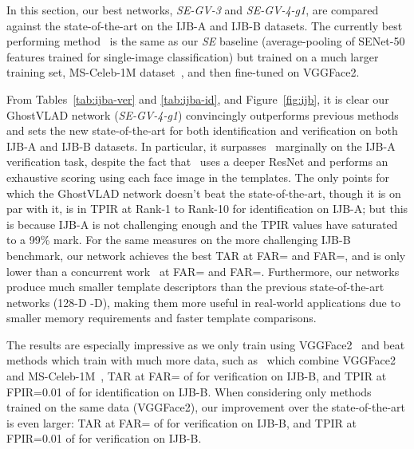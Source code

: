 \documentclass[runningheads]{llncs}
\begin{document}
 

In this section, our best networks,
\emph{SE-GV-3} and \emph{SE-GV-4-g1},
are compared against the state-of-the-art
on the IJB-A and IJB-B datasets.
The currently best performing method~\cite{Cao18}
is the same as our \emph{SE} baseline
(\ie average-pooling of SENet-50 features
trained for single-image classification)
but trained on a much larger training set,
MS-Celeb-1M dataset~\cite{Guo16},
and then fine-tuned on VGGFace2.

From Tables~\ref{tab:ijba-ver} and \ref{tab:ijba-id},
and Figure~\ref{fig:ijb},
it is clear our GhostVLAD network (\emph{SE-GV-4-g1})
convincingly outperforms previous methods and sets
the new state-of-the-art for both identification and
verification on both IJB-A and IJB-B datasets.
In particular, it surpasses~\cite{Zheng18} marginally
on the IJB-A verification task,  
despite the fact that~\cite{Zheng18}
uses a deeper ResNet and performs an exhaustive
scoring using each face image in the templates.
The only points for which the GhostVLAD network 
doesn't beat the state-of-the-art, 
though it is on par with it, 
is in TPIR at Rank-1 to Rank-10
for identification on IJB-A;  but this is because
IJB-A is not challenging enough and the TPIR values have
saturated to a 99\% mark.
For the same measures on the more challenging IJB-B benchmark, 
our network achieves the best TAR at FAR= and FAR=,
and is only lower than a concurrent work~\cite{Xie18a} at FAR= and FAR=.
Furthermore, our networks produce much 
smaller template descriptors than the previous state-of-the-art 
networks (128-D -D),
making them more useful 
in real-world applications due to smaller memory requirements
and faster template comparisons.


The results are especially impressive as we only train
using VGGFace2~\cite{Cao18} and beat methods which train with much more
data, such as~\cite{Cao18}
which combine VGGFace2 and MS-Celeb-1M~\cite{Guo16},
\eg TAR at FAR= of  \vs  for verification on IJB-B,
and TPIR at FPIR=0.01 of  \vs  for identification on IJB-B.
When considering only methods trained on the same data (VGGFace2),
our improvement over the state-of-the-art is even larger:
TAR at FAR= of  \vs  for verification on IJB-B,
and TPIR at FPIR=0.01 of  \vs  for verification on IJB-B.
\end{document}
